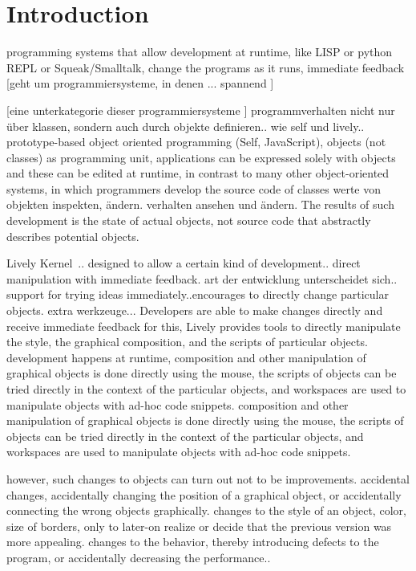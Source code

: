 
\chapter{Introduction} \label{chapter:INTRODUCTION}


programming systems that allow development at runtime, like LISP or python REPL or Squeak/Smalltalk, change the programs as it runs, immediate feedback
[geht um programmiersysteme, in denen ... spannend ]

[eine unterkategorie dieser programmiersysteme ] programmverhalten nicht nur über klassen, sondern auch durch objekte definieren.. wie self und lively..
prototype-based object oriented programming (Self, JavaScript), objects (not classes) as programming unit, applications can be expressed solely with objects and these can be edited at runtime, in contrast to many other object-oriented systems, in which programmers develop the source code of classes
werte von objekten inspekten, ändern. verhalten ansehen und ändern.
The results of such development is the state of actual objects, not source code that abstractly describes potential objects.

Lively Kernel~\cite{Ingalls2008LKS,Krahn2009LWD}.. designed to allow a certain kind of development.. direct manipulation with immediate feedback.
art der entwicklung unterscheidet sich.. support for trying ideas immediately..encourages to directly change particular objects.
extra werkzeuge... Developers are able to make changes directly and receive immediate feedback
for this, Lively provides tools to directly manipulate the style, the graphical composition, and the scripts of particular objects. 
development happens at runtime, composition and other manipulation of graphical objects is done directly using the mouse, the scripts of objects can be tried directly in the context of the particular objects, and workspaces are used to manipulate objects with ad-hoc code snippets.
composition and other manipulation of graphical objects is done directly using the mouse, the scripts of objects can be tried directly in the context of the particular objects, and workspaces are used to manipulate objects with ad-hoc code snippets.

however, such changes to objects can turn out not to be improvements. 
accidental changes, accidentally changing the position of a graphical object, or accidentally connecting the wrong objects graphically.
changes to the style of an object, color, size of borders, only to later-on realize or decide that the previous version was more appealing.
changes to the behavior, thereby introducing defects to the program, or accidentally decreasing the performance..

